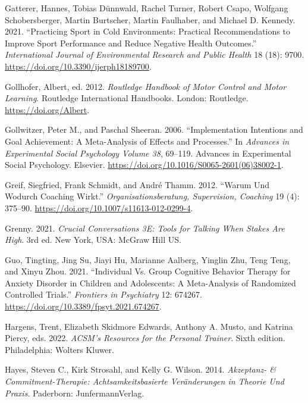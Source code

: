 \documentclass[
  letterpaper,
  DIV=11,
  numbers=noendperiod]{scrreprt}
\newlength{\cslhangindent}
\newenvironment{CSLReferences}[2] %
 {\begin{list}{}{%
  \setlength{\itemindent}{0pt}
  \setlength{\leftmargin}{0pt}
  \setlength{\parsep}{0pt}
  \ifodd #1
   \setlength{\leftmargin}{\cslhangindent}
   \setlength{\itemindent}{-1\cslhangindent}
  \fi
  \setlength{\itemsep}{#2\baselineskip}}}
 {\end{list}}
\begin{document}
\begin{CSLReferences}{1}{0}
Gatterer, Hannes, Tobias Dünnwald, Rachel Turner, Robert Csapo, Wolfgang
Schobersberger, Martin Burtscher, Martin Faulhaber, and Michael D.
Kennedy. 2021. {``Practicing {Sport} in {Cold Environments}: {Practical
Recommendations} to {Improve Sport Performance} and {Reduce Negative
Health Outcomes}.''} \emph{International Journal of Environmental
Research and Public Health} 18 (18): 9700.
\url{https://doi.org/10.3390/ijerph18189700}.

Gollhofer, Albert, ed. 2012. \emph{Routledge Handbook of Motor Control
and Motor Learning}. Routledge International Handbooks. London:
Routledge. \url{https://doi.org/Albert}.

Gollwitzer, Peter M., and Paschal Sheeran. 2006. {``Implementation
{Intentions} and {Goal Achievement}: {A Meta}-Analysis of {Effects} and
{Processes}.''} In \emph{Advances in {Experimental Social Psychology
Volume} 38}, 69--119. Advances in {Experimental Social Psychology}.
Elsevier. \url{https://doi.org/10.1016/S0065-2601(06)38002-1}.

Greif, Siegfried, Frank Schmidt, and André Thamm. 2012. {``Warum Und
Wodurch {Coaching} Wirkt.''} \emph{Organisationsberatung, Supervision,
Coaching} 19 (4): 375--90.
\url{https://doi.org/10.1007/s11613-012-0299-4}.

Grenny. 2021. \emph{Crucial {Conversations 3E}: {Tools} for {Talking
When Stakes Are High}}. 3rd ed. New York, USA: McGraw Hill US.

Guo, Tingting, Jing Su, Jiayi Hu, Marianne Aalberg, Yinglin Zhu, Teng
Teng, and Xinyu Zhou. 2021. {``Individual Vs. {Group Cognitive Behavior
Therapy} for {Anxiety Disorder} in {Children} and {Adolescents}: {A
Meta-Analysis} of {Randomized Controlled Trials}.''} \emph{Frontiers in
Psychiatry} 12: 674267. \url{https://doi.org/10.3389/fpsyt.2021.674267}.

Hargens, Trent, Elizabeth Skidmore Edwards, Anthony A. Musto, and
Katrina Piercy, eds. 2022. \emph{{ACSM}'s Resources for the Personal
Trainer}. Sixth edition. Philadelphia: Wolters Kluwer.

Hayes, Steven C., Kirk Strosahl, and Kelly G. Wilson. 2014.
\emph{Akzeptanz- \& {Commitment-Therapie}: {Achtsamkeitsbasierte
Ver{ä}nderungen} in {Theorie} Und {Praxis}}. Paderborn:
JunfermannVerlag.


\end{CSLReferences}
\end{document}
